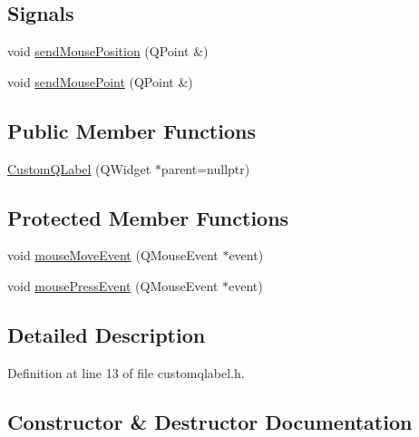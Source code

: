 \subsection*{Signals}
\begin{DoxyCompactItemize}
\item 
void \mbox{\hyperlink{classCustomQLabel_ac07a9c61c0ac4df046b70cbec46e1af5}{send\+Mouse\+Position}} (Q\+Point \&)
\item 
void \mbox{\hyperlink{classCustomQLabel_a7d4eb54a2a007c20a19dd5f7fac50af4}{send\+Mouse\+Point}} (Q\+Point \&)
\end{DoxyCompactItemize}
\subsection*{Public Member Functions}
\begin{DoxyCompactItemize}
\item 
\mbox{\hyperlink{classCustomQLabel_ac856b3704cbe770fd195ec7d02a472c9}{Custom\+Q\+Label}} (Q\+Widget $\ast$parent=nullptr)
\end{DoxyCompactItemize}
\subsection*{Protected Member Functions}
\begin{DoxyCompactItemize}
\item 
void \mbox{\hyperlink{classCustomQLabel_ad38c1fd51481999bb650c6a38dfc7e36}{mouse\+Move\+Event}} (Q\+Mouse\+Event $\ast$event)
\item 
void \mbox{\hyperlink{classCustomQLabel_abceeb9e01468b1797bff7e93978cbb55}{mouse\+Press\+Event}} (Q\+Mouse\+Event $\ast$event)
\end{DoxyCompactItemize}


\subsection{Detailed Description}


Definition at line 13 of file customqlabel.\+h.



\subsection{Constructor \& Destructor Documentation}
\mbox{\label{classCustomQLabel_ac856b3704cbe770fd195ec7d02a472c9}} 
